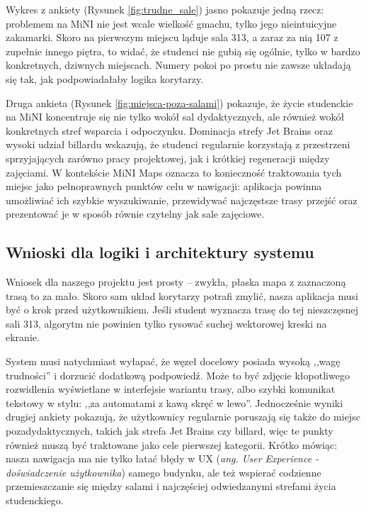 \documentclass[14pt,a4paper]{extarticle}
\begin{document}
Wykres z ankiety (Rysunek \ref{fig:trudne_sale}) jasno pokazuje jedną rzecz: problemem na MiNI nie jest wcale wielkość gmachu, tylko jego nieintuicyjne zakamarki. Skoro na pierwszym miejscu ląduje sala 313, a zaraz za nią 107 z zupełnie innego piętra, to widać, że studenci nie gubią się ogólnie, tylko w bardzo konkretnych, dziwnych miejscach. Numery pokoi po prostu nie zawsze układają się tak, jak podpowiadałaby logika korytarzy.

Druga ankieta (Rysunek \ref{fig:miejsca-poza-salami}) pokazuje, że życie studenckie na MiNI koncentruje się nie tylko wokół sal dydaktycznych, ale również wokół konkretnych stref wsparcia i odpoczynku. Dominacja strefy Jet Brains oraz wysoki udział billardu wskazują, że studenci regularnie korzystają z przestrzeni sprzyjających zarówno pracy projektowej, jak i krótkiej regeneracji między zajęciami. W kontekście MiNI Maps oznacza to konieczność traktowania tych miejsc jako pełnoprawnych punktów celu w nawigacji: aplikacja powinna umożliwiać ich szybkie wyszukiwanie, przewidywać najczęstsze trasy przejść oraz prezentować je w sposób równie czytelny jak sale zajęciowe.

\subsection{Wnioski dla logiki i architektury systemu}

Wniosek dla naszego projektu jest prosty -- zwykła, płaska mapa z zaznaczoną trasą to za mało. Skoro sam układ korytarzy potrafi zmylić, nasza aplikacja musi być o krok przed użytkownikiem. Jeśli student wyznacza trasę do tej nieszczęsnej sali 313, algorytm nie powinien tylko rysować suchej wektorowej kreski na ekranie.

System musi natychmiast wyłapać, że węzeł docelowy posiada wysoką ,,wagę trudności'' i dorzucić dodatkową podpowiedź. Może to być zdjęcie kłopotliwego rozwidlenia wyświetlane w interfejsie wariantu trasy, albo szybki komunikat tekstowy w stylu: ,,za automatami z kawą skręć w lewo''. Jednocześnie wyniki drugiej ankiety pokazują, że użytkownicy regularnie poruszają się także do miejsc pozadydaktycznych, takich jak strefa Jet Brains czy billard, więc te punkty również muszą być traktowane jako cele pierwszej kategorii. Krótko mówiąc: nasza nawigacja ma nie tylko łatać błędy w UX (\textit{ang. User Experience - doświadczenie użytkownika}) samego budynku, ale też wspierać codzienne przemieszczanie się między salami i najczęściej odwiedzanymi strefami życia studenckiego.
\end{document}
